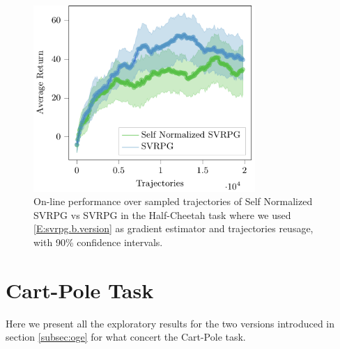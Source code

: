 \begin{figure}[h]
	\begin{minipage}[h]{1\textwidth}
		\centering
		\includegraphics[width=0.75\textwidth]{Images/Experiments/swimmer_SVRPG_vs_SN_SVRPG_B_reuse.pdf}
		\vspace{-0.1in}
		\caption{On-line performance over sampled trajectories of Self Normalized \acs{SVRPG} vs \acs{SVRPG} in the Half-Cheetah task where we used \ref{E:svrpg.b.version} as gradient estimator and trajectories reusage, with 90\% confidence intervals.}
		\label{fig:swimmereleven}
	\end{minipage}
	\vspace{-0.15in}
\end{figure}



\clearpage
\vspace{-0.05in}
\section{Cart-Pole Task}
\vspace{-0.05in}
Here we present all the exploratory results for the two versions introduced in section \ref{subsec:oge} for what concert the Cart-Pole task.

